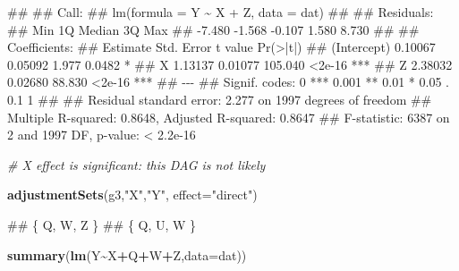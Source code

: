 \documentclass[
]{book}
\newenvironment{Shaded}{\begin{snugshade}}{\end{snugshade}}
\newcommand{\AttributeTok}[1]{\textcolor[rgb]{0.13,0.29,0.53}{#1}}
\newcommand{\CommentTok}[1]{\textcolor[rgb]{0.56,0.35,0.01}{\textit{#1}}}
\newcommand{\FunctionTok}[1]{\textcolor[rgb]{0.13,0.29,0.53}{\textbf{#1}}}
\newcommand{\NormalTok}[1]{#1}
\newcommand{\SpecialCharTok}[1]{\textcolor[rgb]{0.81,0.36,0.00}{\textbf{#1}}}
\newcommand{\StringTok}[1]{\textcolor[rgb]{0.31,0.60,0.02}{#1}}
\begin{document}
\begin{Shaded}
\begin{Highlighting}[]
\NormalTok{\#\# }
\NormalTok{\#\# Call:}
\NormalTok{\#\# lm(formula = Y \textasciitilde{} X + Z, data = dat)}
\NormalTok{\#\# }
\NormalTok{\#\# Residuals:}
\NormalTok{\#\#    Min     1Q Median     3Q    Max }
\NormalTok{\#\# {-}7.480 {-}1.568 {-}0.107  1.580  8.730 }
\NormalTok{\#\# }
\NormalTok{\#\# Coefficients:}
\NormalTok{\#\#             Estimate Std. Error t value Pr(\textgreater{}|t|)    }
\NormalTok{\#\# (Intercept)  0.10067    0.05092   1.977   0.0482 *  }
\NormalTok{\#\# X            1.13137    0.01077 105.040   \textless{}2e{-}16 ***}
\NormalTok{\#\# Z            2.38032    0.02680  88.830   \textless{}2e{-}16 ***}
\NormalTok{\#\# {-}{-}{-}}
\NormalTok{\#\# Signif. codes:  0 \textquotesingle{}***\textquotesingle{} 0.001 \textquotesingle{}**\textquotesingle{} 0.01 \textquotesingle{}*\textquotesingle{} 0.05 \textquotesingle{}.\textquotesingle{} 0.1 \textquotesingle{} \textquotesingle{} 1}
\NormalTok{\#\# }
\NormalTok{\#\# Residual standard error: 2.277 on 1997 degrees of freedom}
\NormalTok{\#\# Multiple R{-}squared:  0.8648, Adjusted R{-}squared:  0.8647 }
\NormalTok{\#\# F{-}statistic:  6387 on 2 and 1997 DF,  p{-}value: \textless{} 2.2e{-}16}
\end{Highlighting}
\end{Shaded}

\begin{Shaded}
\begin{Highlighting}[]
\CommentTok{\# X effect is significant: this DAG is not likely}

\FunctionTok{adjustmentSets}\NormalTok{(g3,}\StringTok{"X"}\NormalTok{,}\StringTok{"Y"}\NormalTok{, }\AttributeTok{effect=}\StringTok{"direct"}\NormalTok{)}
\end{Highlighting}
\end{Shaded}

\begin{Shaded}
\begin{Highlighting}[]
\NormalTok{\#\# \{ Q, W, Z \}}
\NormalTok{\#\# \{ Q, U, W \}}
\end{Highlighting}
\end{Shaded}

\begin{Shaded}
\begin{Highlighting}[]
\FunctionTok{summary}\NormalTok{(}\FunctionTok{lm}\NormalTok{(Y}\SpecialCharTok{\textasciitilde{}}\NormalTok{X}\SpecialCharTok{+}\NormalTok{Q}\SpecialCharTok{+}\NormalTok{W}\SpecialCharTok{+}\NormalTok{Z,}\AttributeTok{data=}\NormalTok{dat))}
\end{Highlighting}
\end{Shaded}
\end{document}
